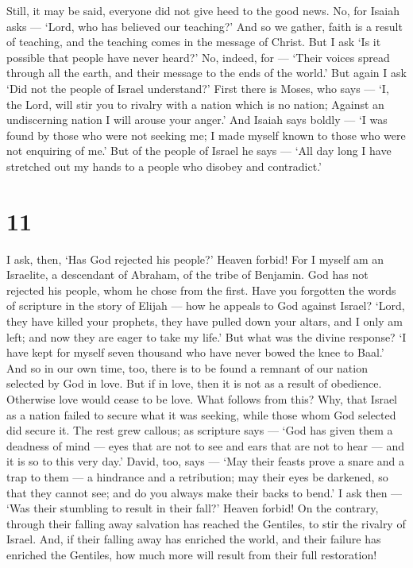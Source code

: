  Still, it may be said, everyone did not give heed to the
good news. No, for Isaiah asks --- `Lord, who has believed our
teaching?'  And so we gather, faith is a result of
teaching, and the teaching comes in the message of Christ. 
But I ask `Is it possible that people have never heard?' No, indeed, for
--- `Their voices spread through all the earth, and their message to the
ends of the world.'  But again I ask `Did not the people of
Israel understand?' First there is Moses, who says --- `I, the Lord,
will stir you to rivalry with a nation which is no nation; Against an
undiscerning nation I will arouse your anger.'  And Isaiah
says boldly --- `I was found by those who were not seeking me; I made
myself known to those who were not enquiring of me.'  But
of the people of Israel he says --- `All day long I have stretched out
my hands to a people who disobey and contradict.'

\hypertarget{section-10}{%
\section{11}\label{section-10}}

 I ask, then, `Has God rejected his people?' Heaven forbid!
For I myself am an Israelite, a descendant of Abraham, of the tribe of
Benjamin.  God has not rejected his people, whom he chose
from the first. Have you forgotten the words of scripture in the story
of Elijah --- how he appeals to God against Israel?  `Lord,
they have killed your prophets, they have pulled down your altars, and I
only am left; and now they are eager to take my life.'  But
what was the divine response? `I have kept for myself seven thousand who
have never bowed the knee to Baal.'  And so in our own time,
too, there is to be found a remnant of our nation selected by God in
love.  But if in love, then it is not as a result of
obedience. Otherwise love would cease to be love.  What
follows from this? Why, that Israel as a nation failed to secure what it
was seeking, while those whom God selected did secure it. 
The rest grew callous; as scripture says --- `God has given them a
deadness of mind --- eyes that are not to see and ears that are not to
hear --- and it is so to this very day.'  David, too, says
--- `May their feasts prove a snare and a trap to them --- a hindrance
and a retribution;  may their eyes be darkened, so that
they cannot see; and do you always make their backs to bend.'
 I ask then --- `Was their stumbling to result in their
fall?' Heaven forbid! On the contrary, through their falling away
salvation has reached the Gentiles, to stir the rivalry of Israel.
 And, if their falling away has enriched the world, and
their failure has enriched the Gentiles, how much more will result from
their full restoration!

